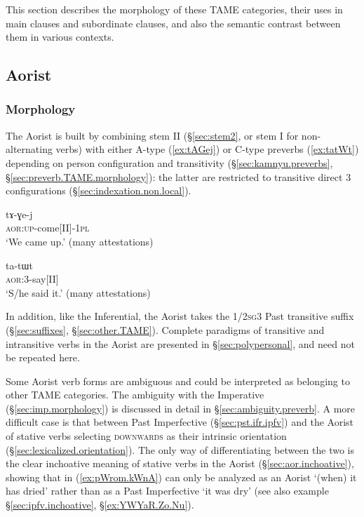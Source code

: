 This section describes the morphology of these TAME categories, their uses in main clauses and subordinate clauses, and also the semantic contrast between them in various contexts.


\subsection{Aorist}    \label{sec:aor}

\subsubsection{Morphology} \label{sec:aor.morphology}
The Aorist is built by combining stem II (§\ref{sec:stem2}, or stem I for non-alternating verbs) with either A-type (\ref{ex:tAGej}) or C-type preverbs (\ref{ex:tatWt}) depending on person configuration and transitivity (§\ref{sec:kamnyu.preverbs}, §\ref{sec:preverb.TAME.morphology}): the latter are restricted to transitive direct 3\flobv{} configurations (§\ref{sec:indexation.non.local}).

\begin{exe}
\ex \label{ex:tAGej}
 \gll tɤ-ɣe-j \\
\textsc{aor}:\textsc{up}-come[II]-\textsc{1pl} \\
\glt `We came up.' (many attestations)
\end{exe}

\begin{exe}
\ex \label{ex:tatWt}
 \gll ta-tɯt \\
\textsc{aor}:3\flobv{}-say[II]  \\
\glt `S/he said it.' (many attestations)
\end{exe}

In addition, like the Inferential, the Aorist takes the 1/2\textsc{sg}\fl{}3 Past transitive suffix  (§\ref{sec:suffixes}, §\ref{sec:other.TAME}). Complete paradigms of transitive and intransitive verbs in the Aorist are presented in §\ref{sec:polypersonal}, and need not be repeated here.

Some Aorist verb forms are ambiguous and could be interpreted as belonging to other TAME categories. The ambiguity with the Imperative (§\ref{sec:imp.morphology}) is discussed in detail in §\ref{sec:ambiguity.preverb}. A more difficult case is that between Past Imperfective  (§\ref{sec:pst.ifr.ipfv}) and the Aorist of stative verbs selecting \textsc{downwards} as their intrinsic orientation (§\ref{sec:lexicalized.orientation}). The only way of differentiating between the two is the clear inchoative meaning of stative verbs in the Aorist (§\ref{sec:aor.inchoative}), showing that  in (\ref{ex:pWrom.kWnA}) can only be analyzed as an Aorist `(when) it has dried' rather than as a Past Imperfective `it was dry' (see also example §\ref{sec:ipfv.inchoative},  §\ref{ex:YWYaR.Zo.Nu}).

